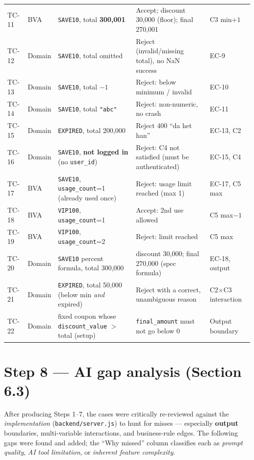 \documentclass[11pt,a4paper]{article}
\newcommand{\code}[1]{\texttt{#1}}
\begin{document}
\begin{center}
\begin{longtable}{@{}C{1.15cm} C{1.15cm} L{4.7cm} L{4.6cm} L{2.9cm}@{}}
TC-11 & BVA    & \code{SAVE10}, total \textbf{300{,}001} & Accept; discount 30{,}000 (floor); final 270{,}001 & C3 min$+1$ \\
TC-12 & Domain & \code{SAVE10}, total omitted & Reject (invalid/missing total), no NaN success & EC-9 \\
TC-13 & Domain & \code{SAVE10}, total \textbf{$-1$} & Reject: below minimum / invalid & EC-10 \\
TC-14 & Domain & \code{SAVE10}, total \code{"abc"} & Reject: non-numeric, no crash & EC-11 \\
TC-15 & Domain & \code{EXPIRED}, total 200{,}000 & Reject 400 ``da het han'' & EC-13, C2 \\
TC-16 & Domain & \code{SAVE10}, \textbf{not logged in} (no \code{user\_id}) & Reject: C4 not satisfied (must be authenticated) & EC-15, C4 \\
TC-17 & BVA    & \code{SAVE10}, \code{usage\_count}=1 (already used once) & Reject: usage limit reached (max 1) & EC-17, C5 max \\
TC-18 & BVA    & \code{VIP100}, \code{usage\_count}=1 & Accept: 2nd use allowed & C5 max$-1$ \\
TC-19 & BVA    & \code{VIP100}, \code{usage\_count}=2 & Reject: limit reached & C5 max \\
TC-20 & Domain & \code{SAVE10} percent formula, total 300{,}000 & discount 30{,}000; final 270{,}000 (spec formula) & EC-18, output \\
TC-21 & Domain & \code{EXPIRED}, total 50{,}000 (below min \emph{and} expired) & Reject with a correct, unambiguous reason & C2$\times$C3 interaction \\
TC-22 & Domain & fixed coupon whose \code{discount\_value} $>$ total (setup) & \code{final\_amount} must not go below 0 & Output boundary \\
\bottomrule
\end{longtable}
\end{center}

\section{Step 8 --- AI gap analysis (Section 6.3)}

After producing Steps 1--7, the cases were critically re-reviewed against the
\emph{implementation} (\code{backend/server.js}) to hunt for misses --- especially
\textbf{output} boundaries, multi-variable interactions, and business-rule edges.
The following gaps were found and added; the ``Why missed'' column classifies each
as \emph{prompt quality}, \emph{AI tool limitation}, or \emph{inherent feature
complexity}.
\end{document}
